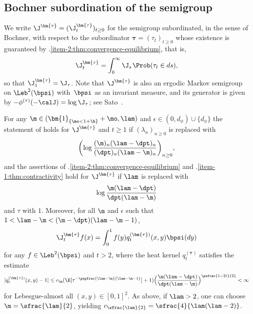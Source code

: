 \subsection{Bochner subordination of the semigroup}

We write $\J^{\bm{\tau}} = (\J_t^{\bm{\tau}})_{t \geq 0}$ for the semigroup subordinated, in the sense of Bochner, with respect to the subordinator ${\bm{\tau}} = (\tau_t)_{t \geq 0}$ whose existence is guaranteed by .\eqref{item-2:thm:convergence-equilibrium}, that is,
\begin{equation*}
\J_t^{\bm{\tau}} = \int_0^\infty \J_s \hspace{1pt} \Prob(\tau_t \in ds),
\end{equation*}
so that $\J_1^{\bm{\tau}} = \J_\tau$. Note that $ \J^{\bm{\tau}}$ is also an ergodic Markov semigroup on $\Leb^2(\bpsi)$ with~$\bpsi$ as an invariant measure, and its generator is given by $-\phi^{(\tau)}(-\calJ) = \log \J_\tau$; see Sato~\cite[Chap.\,6]{Sato1999}.

\begin{theorem}
\label{cor:subordinated}
For any $\m \in (\bm{1}_{\{\mo < 1+\h\}} + \mo , \lam)$ and $\epsilon \in (0,d_\phi) \cup \{d_\phi\}$ the statement of  holds for $\J^{\bm{\tau}}$ and $t \ge 1$
if $(\lambda_n)_{n \geq 0}$ is replaced with
\[
\biggl(\log \frac{(\m)_n(\lam-\dpt)_n}{(\dpt)_n(\lam-\m)_n}\biggr)_{n \geq 0},
\]
and the assertions of .\eqref{item-2:thm:convergence-equilibrium} and .\eqref{item-1:thm:contractivity} hold for $\J^{\bm{\tau}}$ if $\lam$ is replaced with
\[
\log \frac{\m(\lam-\dpt)}{\dpt(\lam-\m)}
\]
and $\tau$ with $1$. Moreover, for all $\m$ and $\epsilon$ such that $1 < \lam - \m < (\m - \dpt)(\lam-\m-1)$,
\[
\J_t^{\bm{\tau}} f (x) = \int_0^1 f(y) q_t^{(\bm{\tau})}(x,y) \bpsi(dy)
\]
for any $f\in \Leb^2(\bpsi)$ and $t > 2$, where the heat kernel $q_t^{(\bm{\tau})}$ satisfies the estimate
\begin{equation*}
|q_t^{(\bm{\tau})}(x,y) - 1| \leq c_\m(\E[\tau^{-\pspfrac{\lam-\m}{\lam-\m-1}}]+1) \Bigl(\frac{\m(\lam-\dpt)}{\dpt(\lam-\m)}\Bigr)^{\psfrac{1-2t}{2}} < \infty
\end{equation*}
for Lebesgue-almost all $(x,y) \in [0,1]^2$. As above, if $\lam> 2$, one can choose $\m=\sfrac{\lam}{2}$, yielding $c_{\sfrac{\lam}{2}}=\sfrac{4}{\lam(\lam- 2)}$.
\end{theorem}

